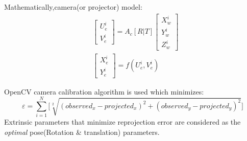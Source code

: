 \documentclass[9pt]{beamer}
\begin{document}
\begin{frame}
Mathematically,camera(or projector) model:
\begin{equation}
\begin{aligned}
& \begin{bmatrix}
U_e^i \\
V_e^i
\end{bmatrix} 
=A_c[R|T]\begin{bmatrix}
X_w^i \\
Y_w^i \\
Z_w^i
\end{bmatrix} \\
& \begin{bmatrix}
X_e^i \\
Y_e^i
\end{bmatrix}
=f(U_e^i,V_e^i)
\end{aligned}
\end{equation}

OpenCV camera calibration algorithm is used which minimizes:\newline
\begin{equation}
\varepsilon=\sum_{i=1}^{N}\bigg[\sqrt[2]{(observed_x-projected_x)^2+(observed_y-projected_y)^2}\bigg]
\end{equation}
Extrinsic parameters that minimize reprojection error are considered as the \textit{optimal} pose(Rotation \& translation)  
parameters.\newline

\end{frame}
\end{document}

